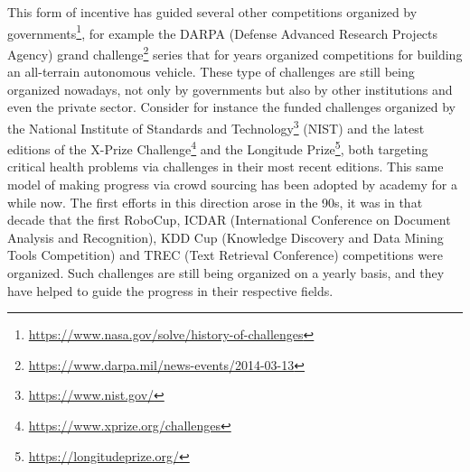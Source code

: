 \documentclass[twoside,11pt]{article}
\begin{document}
This form of incentive has guided several other competitions organized by governments\footnote{\url{https://www.nasa.gov/solve/history-of-challenges}}, for example %
the DARPA (Defense Advanced Research Projects Agency) grand challenge\footnote{\url{https://www.darpa.mil/news-events/2014-03-13}} series that for years organized competitions for building an all-terrain autonomous vehicle. These type of challenges are still being organized nowadays, not only by governments but also by other institutions and even the private sector. 
Consider for instance the funded challenges organized by the National Institute of Standards and Technology\footnote{\url{https://www.nist.gov/}}  (NIST) and the latest editions of the X-Prize Challenge\footnote{\url{https://www.xprize.org/challenges}} and the  Longitude Prize\footnote{\url{https://longitudeprize.org/}}, both targeting critical  health problems via challenges in their most recent editions. %
This same model of making progress via crowd sourcing has been adopted by academy for a while now. The first efforts in this direction arose in the 90s, it was in that decade that the first RoboCup, ICDAR (International Conference on Document Analysis and Recognition), KDD Cup (Knowledge Discovery and Data Mining Tools Competition) and TREC (Text Retrieval Conference) %
competitions were organized. Such challenges are still being organized on a yearly basis, %
and they have helped to guide the progress in their respective fields. %
\end{document}
